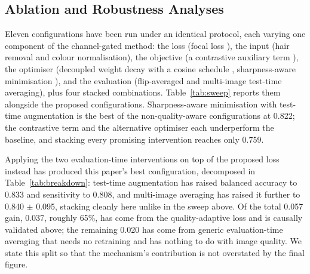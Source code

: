 \documentclass[conference]{IEEEtran}
\begin{document}
\subsection{Ablation and Robustness Analyses}
Eleven configurations have been run under an identical protocol, each varying one component of
the channel-gated method: the loss (focal loss \cite{focal}), the input (hair removal and colour
normalisation), the objective (a contrastive auxiliary term \cite{supcon}), the optimiser
(decoupled weight decay with a cosine schedule \cite{adamw}, sharpness-aware minimisation
\cite{sam}), and the evaluation (flip-averaged and multi-image test-time averaging), plus four
stacked combinations. Table~\ref{tab:sweep} reports them alongside the proposed
configurations. Sharpness-aware minimisation with test-time augmentation is the best of the
non-quality-aware configurations at 0.822; the contrastive term and the alternative
optimiser each underperform the baseline, and stacking every promising intervention reaches only
0.759.

Applying the two evaluation-time interventions on top of the proposed loss instead has produced
this paper's best configuration, decomposed in Table~\ref{tab:breakdown}: test-time augmentation
has raised balanced accuracy to 0.833 and sensitivity to 0.808, and multi-image averaging has
raised it further to 0.840 $\pm$ 0.095, stacking cleanly here unlike in the sweep above. Of the
total 0.057 gain, 0.037, roughly 65\%, has come from the quality-adaptive loss and is causally
validated above; the remaining 0.020 has come from generic evaluation-time averaging that needs
no retraining and has nothing to do with image quality. We state this split so that the
mechanism's contribution is not overstated by the final figure.
\end{document}
